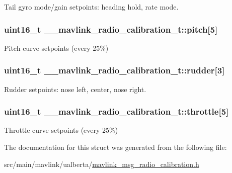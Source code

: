 Tail gyro mode/gain setpoints\+: heading hold, rate mode. 

\hypertarget{struct____mavlink__radio__calibration__t_adb1f8ceaeecadcb83de5976f03cb7774}{
\subsubsection[{pitch}]{\setlength{\rightskip}{0pt plus 5cm}uint16\+\_\+t \+\_\+\+\_\+mavlink\+\_\+radio\+\_\+calibration\+\_\+t\+::pitch\mbox{[}5\mbox{]}}}\label{struct____mavlink__radio__calibration__t_adb1f8ceaeecadcb83de5976f03cb7774}


Pitch curve setpoints (every 25\%) 

\hypertarget{struct____mavlink__radio__calibration__t_aa620c57cf3f9f311f7900b9afd6d1e89}{
\subsubsection[{rudder}]{\setlength{\rightskip}{0pt plus 5cm}uint16\+\_\+t \+\_\+\+\_\+mavlink\+\_\+radio\+\_\+calibration\+\_\+t\+::rudder\mbox{[}3\mbox{]}}}\label{struct____mavlink__radio__calibration__t_aa620c57cf3f9f311f7900b9afd6d1e89}


Rudder setpoints\+: nose left, center, nose right. 

\hypertarget{struct____mavlink__radio__calibration__t_ab7f88c470d8c7fc6be72399aa6f75540}{
\subsubsection[{throttle}]{\setlength{\rightskip}{0pt plus 5cm}uint16\+\_\+t \+\_\+\+\_\+mavlink\+\_\+radio\+\_\+calibration\+\_\+t\+::throttle\mbox{[}5\mbox{]}}}\label{struct____mavlink__radio__calibration__t_ab7f88c470d8c7fc6be72399aa6f75540}


Throttle curve setpoints (every 25\%) 



The documentation for this struct was generated from the following file\+:\begin{DoxyCompactItemize}
\item 
src/main/mavlink/ualberta/\hyperlink{mavlink__msg__radio__calibration_8h}{mavlink\+\_\+msg\+\_\+radio\+\_\+calibration.\+h}\end{DoxyCompactItemize}
